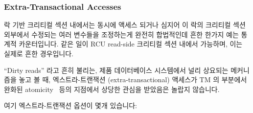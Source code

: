 \subsubsection{Extra-Transactional Accesses}
\label{sec:future:Extra-Transactional Accesses}

락 기반 크리티컬 섹션 내에서는 동시에 액세스 되거나 심지어 이 락의 크리티컬
섹션 외부에서 수정되는 여러 변수들을 조정하는게 완전히 합법적인데 흔한 한가지
예는 통계적 카운터입니다.
같은 일이 RCU read-side 크리티컬 섹션 내에서 가능하며, 이는 실제로 흔한
경우입니다.

``Dirty reads'' 라고 흔히 불리는, 제품 데이터베이스 시스템에서 널리 상요되는
메커니즘을 놓고 볼 때, 엑스트라-트랜잭션 (extra-transactional) 액세스가 TM 의
부분에서 완화된 atomicity~\cite{Blundell2006TMdeadlock} 등의 지점에서 상당한
관심을 받았음은 놀랍지 않습니다.

여기 엑스트라-트랜잭션 옵션이 몇개 있습니다:

